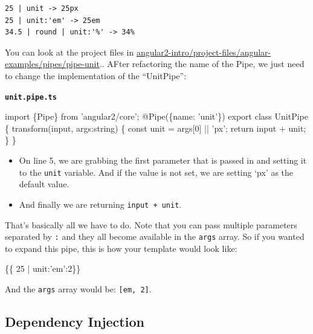 \documentclass[12pt,]{article}
\newenvironment{Shaded}{}{}
\newcommand{\KeywordTok}[1]{\textcolor[rgb]{0.00,0.00,1.00}{{#1}}}
\newcommand{\DataTypeTok}[1]{{#1}}
\newcommand{\DecValTok}[1]{{#1}}
\newcommand{\FunctionTok}[1]{{#1}}
\newcommand{\NormalTok}[1]{{#1}}
\providecommand{\tightlist}{%
  \setlength{\itemsep}{0pt}\setlength{\parskip}{0pt}}
\begin{document}
\begin{verbatim}
25 | unit -> 25px
25 | unit:'em' -> 25em
34.5 | round | unit:'%' -> 34%
\end{verbatim}

You can look at the project files in
\href{https://github.com/st32lth/angular2-intro/tree/master/project-files/angular-examples/pipes/pipe-unit}{angular2-intro/project-files/angular-examples/pipes/pipe-unit}..
AFter refactoring the name of the Pipe, we just need to change the
implementation of the ``UnitPipe'':

\textbf{\texttt{unit.pipe.ts}}

\begin{Shaded}
\begin{Highlighting}[numbers=left,,]
\KeywordTok{import \{Pipe\} from 'angular2/core';}
\FunctionTok{@Pipe}\NormalTok{(\{name: 'unit'\})}
\NormalTok{export }\KeywordTok{class} \NormalTok{UnitPipe \{}
  \FunctionTok{transform}\NormalTok{(input, args:string) \{}
    \DataTypeTok{const} \NormalTok{unit = args[}\DecValTok{0}\NormalTok{] || 'px';}
    \KeywordTok{return} \NormalTok{input + unit;}
  \NormalTok{\}}
\NormalTok{\}}
\end{Highlighting}
\end{Shaded}

\begin{itemize}
\tightlist
\item
  On line 5, we are grabbing the first parameter that is passed in and
  setting it to the \texttt{unit} variable. And if the value is not set,
  we are setting `px' as the default value.
\item
  And finally we are returning \texttt{input\ +\ unit}.
\end{itemize}

That's basically all we have to do. Note that you can pass multiple
parameters separated by \texttt{:} and they all become available in the
\texttt{args} array. So if you wanted to expand this pipe, this is how
your template would look like:

\begin{Shaded}
\begin{Highlighting}[numbers=left,,]
\NormalTok{\{\{ 25 | unit:'em':2\}\}}
\end{Highlighting}
\end{Shaded}

And the \texttt{args} array would be:
\texttt{{[}\textquotesingle{}em\textquotesingle{},\ 2{]}}.

\subsection{Dependency Injection}\label{dependency-injection}
\end{document}
